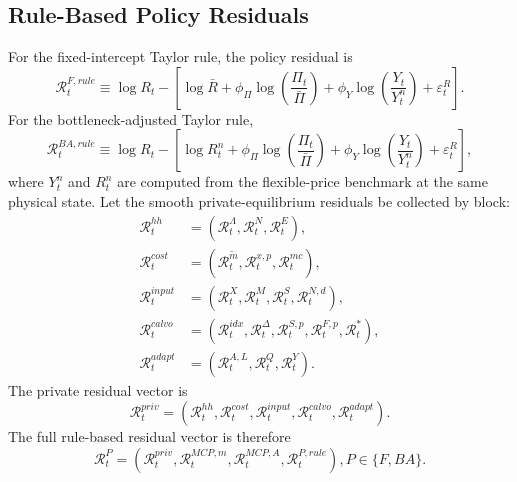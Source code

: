 ﻿\documentclass[12pt]{article}
\theoremstyle{remark}
\begin{document}
\subsection{Rule-Based Policy Residuals}

For the fixed-intercept Taylor rule, the policy residual is
\begin{equation}
    \mathcal R_t^{F,rule}
    \equiv
    \log R_t
    -
    \left[
        \log\bar R
        +
        \phi_\Pi\log\left(\frac{\Pi_t}{\bar\Pi}\right)
        +
        \phi_Y\log\left(\frac{Y_t}{Y_t^n}\right)
        +
        \varepsilon_t^R
    \right].
    \label{eq:app_deqn_fixed_rule}
\end{equation}
For the bottleneck-adjusted Taylor rule,
\begin{equation}
    \mathcal R_t^{BA,rule}
    \equiv
    \log R_t
    -
    \left[
        \log R_t^n
        +
        \phi_\Pi\log\left(\frac{\Pi_t}{\bar\Pi}\right)
        +
        \phi_Y\log\left(\frac{Y_t}{Y_t^n}\right)
        +
        \varepsilon_t^R
    \right],
    \label{eq:app_deqn_ba_rule}
\end{equation}
where $Y_t^n$ and $R_t^n$ are computed from the flexible-price benchmark at the same physical state.
Let the smooth private-equilibrium residuals be collected by block:
\begin{align}
    \mathcal R_t^{hh}
    &=
    (\mathcal R_t^\Lambda,\mathcal R_t^N,\mathcal R_t^E),
    \label{eq:app_deqn_hh_residual_vector}\\
    \mathcal R_t^{cost}
    &=
    (\mathcal R_t^{\tilde m},\mathcal R_t^{x,p},\mathcal R_t^{mc}),
    \label{eq:app_deqn_cost_residual_vector}\\
    \mathcal R_t^{input}
    &=
    (\mathcal R_t^X,\mathcal R_t^M,\mathcal R_t^S,\mathcal R_t^{N,d}),
    \label{eq:app_deqn_input_residual_vector}\\
    \mathcal R_t^{calvo}
    &=
    (\mathcal R_t^{idx},\mathcal R_t^\Delta,\mathcal R_t^{S,p},
    \mathcal R_t^{F,p},\mathcal R_t^*),
    \label{eq:app_deqn_calvo_residual_vector}\\
    \mathcal R_t^{adapt}
    &=
    (\mathcal R_t^{A,L},\mathcal R_t^Q,\mathcal R_t^Y).
    \label{eq:app_deqn_adapt_residual_vector}
\end{align}
The private residual vector is
\begin{equation}
    \mathcal R_t^{priv}
    =
    (\mathcal R_t^{hh},\mathcal R_t^{cost},\mathcal R_t^{input},
    \mathcal R_t^{calvo},\mathcal R_t^{adapt}).
    \label{eq:app_deqn_private_residual_vector}
\end{equation}
The full rule-based residual vector is therefore
\begin{equation}
    \mathcal R_t^{P}
    =
    \left(
        \mathcal R_t^{priv},
        \mathcal R_t^{MCP,m},
        \mathcal R_t^{MCP,A},
        \mathcal R_t^{P,rule}
    \right),
    P\in\{F,BA\}.
    \label{eq:app_deqn_rule_residual_vector}
\end{equation}
\end{document}
